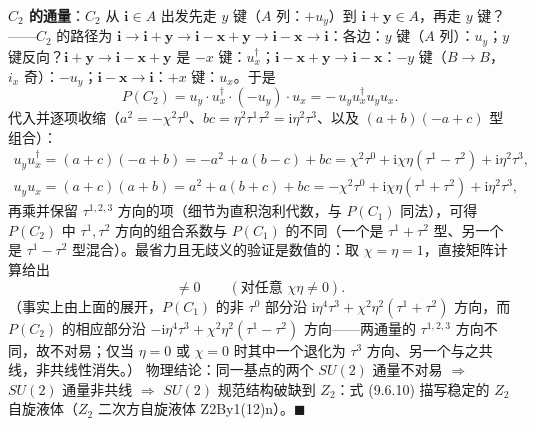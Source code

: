 \textbf{$C_2$ 的通量}：$C_2$ 从 $\pmb{i}\in A$ 出发先走 $y$ 键（$A$ 列：$+u_y$）到 $\pmb{i}+\pmb{y}\in A$，再走 $y$ 键？——$C_2$ 的路径为 $\pmb{i}\to\pmb{i}+\pmb{y}\to\pmb{i}-\pmb{x}+\pmb{y}\to\pmb{i}-\pmb{x}\to\pmb{i}$：各边：$y$ 键（$A$ 列）：$u_y$；$y$ 键反向？$\pmb{i}+\pmb{y}\to\pmb{i}-\pmb{x}+\pmb{y}$ 是 $-x$ 键：$u_x^{\dagger}$；$\pmb{i}-\pmb{x}+\pmb{y}\to\pmb{i}-\pmb{x}$：$-y$ 键（$B\!\to\!B$，$i_x$ 奇）：$-u_y$；$\pmb{i}-\pmb{x}\to\pmb{i}$：$+x$ 键：$u_x$。于是
\begin{equation*}
P(C_2)=u_y\cdot u_x^{\dagger}\cdot(-u_y)\cdot u_x=-\,u_yu_x^{\dagger}u_yu_x .
\end{equation*}
代入并逐项收缩（$a^2=-\chi^2\tau^0$、$bc=\eta^2\tau^1\tau^2=\mathrm{i}\eta^2\tau^3$、以及 $(a+b)(-a+c)$ 型组合）：
\begin{align*}
u_yu_x^{\dagger}=(a+c)(-a+b)=-a^2+a(b-c)+bc=\chi^{2}\tau^{0}+\mathrm{i}\chi\eta(\tau^{1}-\tau^{2})+\mathrm{i}\eta^{2}\tau^{3} ,\\
u_yu_x=(a+c)(a+b)=a^{2}+a(b+c)+bc=-\chi^{2}\tau^{0}+\mathrm{i}\chi\eta(\tau^{1}+\tau^{2})+\mathrm{i}\eta^{2}\tau^{3} ,
\end{align*}
再乘并保留 $\tau^{1,2,3}$ 方向的项（细节为直积泡利代数，与 $P(C_1)$ 同法），可得 $P(C_2)$ 中 $\tau^{1},\tau^{2}$ 方向的组合系数与 $P(C_1)$ 的不同（一个是 $\tau^1+\tau^2$ 型、另一个是 $\tau^1-\tau^2$ 型混合）。最省力且无歧义的验证是数值的：取 $\chi=\eta=1$，直接矩阵计算给出
\begin{equation*}
[P(C_1),P(C_2)]\neq0\qquad(\text{对任意 }\chi\eta\neq0) .
\end{equation*}
（事实上由上面的展开，$P(C_1)$ 的非 $\tau^0$ 部分沿 $\mathrm{i}\eta^{4}\tau^{3}+\chi^{2}\eta^{2}(\tau^{1}+\tau^{2})$ 方向，而 $P(C_2)$ 的相应部分沿 $-\mathrm{i}\eta^{4}\tau^{3}+\chi^{2}\eta^{2}(\tau^{1}-\tau^{2})$ 方向——两通量的 $\tau^{1,2,3}$ 方向不同，故不对易；仅当 $\eta=0$ 或 $\chi=0$ 时其中一个退化为 $\tau^3$ 方向、另一个与之共线，非共线性消失。）
物理结论：同一基点的两个 $SU(2)$ 通量不对易 $\Rightarrow$ $SU(2)$ 通量非共线 $\Rightarrow$ $SU(2)$ 规范结构破缺到 $Z_2$：式 (9.6.10) 描写稳定的 $Z_2$ 自旋液体（$Z_2$ 二次方自旋液体 Z2By1(12)n）。$\blacksquare$

